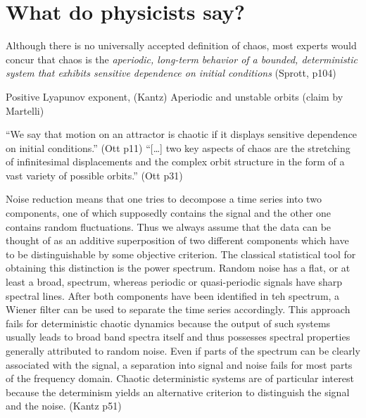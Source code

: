 \documentclass[11pt]{article}
\begin{document}
\section{What do physicists say?}
Although there is no universally accepted definition of chaos,
most experts would concur that chaos is the {\it aperiodic,
  long-term behavior of a bounded, deterministic system
that exhibits sensitive dependence on initial conditions} (Sprott, p104)

Positive Lyapunov exponent, (Kantz)
Aperiodic and unstable orbits (claim by Martelli)

``We say that motion on an attractor is chaotic if
it displays sensitive dependence on initial conditions.'' (Ott p11)
``[\ldots] two key aspects of chaos are the stretching of infinitesimal displacements
and the complex orbit structure in the form of a vast variety of possible orbits.'' (Ott p31)

Noise reduction means that one tries to decompose a time series into
two components, one of which supposedly contains the signal and the other
one contains random fluctuations. Thus we always assume that the data
can be thought of as an additive superposition of two different components which
have to be distinguishable by some objective criterion. The classical statistical
tool for obtaining this distinction is the power spectrum. Random noise has
a flat, or at least a broad, spectrum, whereas periodic or quasi-periodic
signals have sharp spectral lines. After both components have been identified
in teh spectrum, a Wiener filter can be used to separate the time series
accordingly.
This approach fails for deterministic chaotic dynamics because the output
of such systems usually leads to broad band spectra itself and thus possesses
spectral properties generally attributed to random noise. Even if parts of the
spectrum can be clearly associated with the signal, a separation into signal and
noise fails for most parts of the frequency domain. Chaotic deterministic systems
are of particular interest because the determinism yields an alternative criterion
to distinguish the signal and the noise. (Kantz p51)
\end{document}
